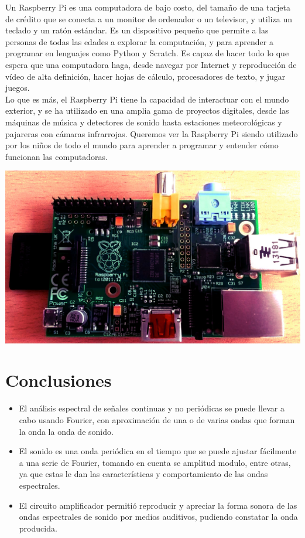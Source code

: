 \documentclass[10pt,a4paper]{book}
\begin{document}
Un Raspberry Pi es una computadora de bajo costo, del tamaño de una  tarjeta de crédito que se conecta a un monitor de ordenador o un televisor, y utiliza un teclado y un ratón estándar. Es un dispositivo pequeño que permite a las personas de todas las edades a explorar la computación, y para aprender a programar en lenguajes como Python y Scratch. Es capaz de hacer todo lo que espera que una computadora haga, desde navegar por Internet y reproducción de vídeo de alta definición, hacer hojas de cálculo, procesadores de texto, y jugar juegos.\\

Lo que es más, el Raspberry Pi tiene la capacidad de interactuar con el mundo exterior, y se ha utilizado en una amplia gama de proyectos  digitales, desde las máquinas de música y detectores de sonido hasta estaciones meteorológicas y  pajareras con cámaras infrarrojas. Queremos ver la Raspberry Pi siendo utilizado por los niños de todo el mundo para aprender a programar y entender cómo funcionan las computadoras.\\

\begin{center}
	\includegraphics[scale=0.35]{raspberry.jpg}
\end{center}

\section{Conclusiones}

\begin{itemize}

\item El análisis espectral de señales continuas y no periódicas se puede llevar a cabo usando Fourier, con aproximación de una o de varias ondas que forman la onda la onda de sonido.
\item El sonido es una onda periódica en el tiempo que se puede ajustar fácilmente a una serie de Fourier, tomando en cuenta se amplitud modulo, entre otras, ya que estas le  dan las características y comportamiento de las ondas espectrales. 
\item El circuito amplificador permitió reproducir y apreciar la forma sonora de las ondas espectrales de sonido por medios auditivos, pudiendo constatar la onda producida.

\end{itemize}
\end{document}
